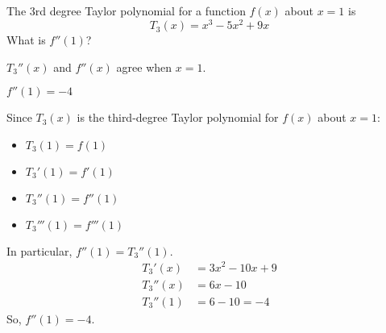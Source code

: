 %
%



\subsection*{\Conceptual}


\begin{question}\label{s3.4.4conc1}
The 3rd degree Taylor polynomial for a function $f(x)$ about $x=1$ is
\[T_3(x)=x^3-5x^2+9x\] What  is $f''(1)$?
\end{question}
\begin{hint}
$T_3''(x)$ and $f''(x)$ agree when $x=1$.
\end{hint}
\begin{answer}
$f''(1)=-4$
\end{answer}
\begin{solution}
Since $T_3(x)$ is the third-degree Taylor polynomial for $f(x)$ about $x=1$:
\begin{itemize}
\item $T_3(1)=f(1)$
\item $T_3'(1)=f'(1)$
\item $T_3''(1)=f''(1)$
\item $T_3'''(1)=f'''(1)$
\end{itemize}
In particular, $f''(1)=T_3''(1)$.
\begin{align*}
T_3'(x)&=3x^2-10x+9\\
T_3''(x)&=6x-10\\
T_3''(1)&=6-10=-4
\end{align*}
So, $f''(1)=-4$.
\end{solution}


